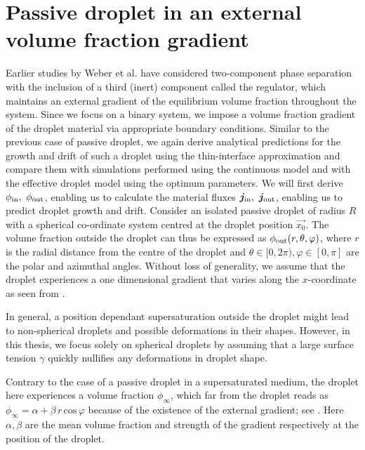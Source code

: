 \section{Passive droplet in an external volume fraction gradient}

Earlier studies by Weber et al. \cite{Review2019,Weber2017} have considered two-component phase separation with the inclusion of a third (inert) component called the regulator, which maintains an external gradient of the equilibrium volume fraction throughout the system.
Since we focus on a binary system, we impose a volume fraction gradient of the droplet material via appropriate boundary conditions.
Similar to the previous case of passive droplet, we again derive analytical predictions for the growth and drift of such a droplet using the thin-interface approximation and compare them with simulations performed using the continuous model and with the effective droplet model using the optimum parameters. 
We will first derive $\phi_\mathrm{in},~\phi_\mathrm{out}$, enabling us to calculate the material fluxes $\boldsymbol{j}_\mathrm{in},~\boldsymbol{j}_\mathrm{out}$, enabling us to predict droplet growth and drift.
Consider an isolated passive droplet of radius $R$ with a spherical co-ordinate system centred at the droplet position $\vec{x_0}$. 
The volume fraction outside the droplet can thus be expressed as $\phi_\mathrm{out}(r, \theta, \varphi)$, where $r$ is the radial distance from the centre of the droplet and $\theta \in [0, 2 \pi), \varphi \in [0, \pi]$ are the polar and azimuthal angles.
Without loss of generality, we assume that the droplet experiences a one dimensional gradient that varies along the $x$-coordinate as seen from .

In general, a position dependant supersaturation outside the droplet might lead to non-spherical droplets and possible deformations in their shapes. 
However, in this thesis, we focus solely on spherical droplets by assuming that a large surface tension $\gamma$ quickly nullifies any deformations in droplet shape.

Contrary to the case of a passive droplet in a supersaturated medium, the droplet here experiences a volume fraction $\phi_{\infty}$, which far from the droplet reads as $\phi_{\infty} = \alpha + \beta \, r \, \text{cos}\,\varphi$ because of the existence of the external gradient; see .
Here $\alpha, \beta$ are the mean volume fraction and strength of the gradient respectively at the position of the droplet. 

